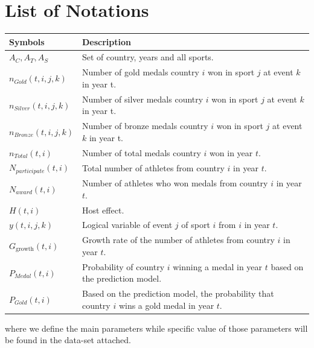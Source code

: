 \documentclass{mcmthesis}
\begin{document}
\section{List of Notations}
\begin{center}
\begin{tabular}{ll}
	\toprule
	{\bf Symbols} & {\bf Description}  \\
	\midrule 
	$A_{C},A_{T},A_{S}$ & Set of country, years and all sports.\\
	$n_{Gold}(t,i,j,k)$ & Number of gold medals country $i$ won in sport $j$ at event $k$ in year t. \\
	$n_{Silver}(t,i,j,k)$ & Number of silver medals country $i$ won in sport $j$ at event $k$ in year t. \\
	$n_{Bronze}(t,i,j,k)$ & Number of bronze medals country $i$ won in sport $j$ at event $k$ in year t. \\
	$n_{Total}(t,i)$ & Number of total medals country $i$ won in year $t$. \\
	$N_{participate}(t,i)$ & Total number of athletes from country $i$ in year $t$. \\
	$N_{award}(t,i)$ & Number of athletes who won medals from country $i$ in year $t$. \\
	$H(t,i)$ & Host effect. \\
	$y(t,i,j,k)$ &  Logical variable of event $j$ of sport $i$ from $i$ in year $t$. \\
	$G_{\text{growth}}(t,i)$ & Growth rate of the number of athletes from country $i$ in year $t$.\\
	$P_{Medal}(t,i)$ & Probability of country $i$ winning a medal in year $t$ based on the prediction model.\\
	$P_{Gold}(t,i)$ & Based on the prediction model, the probability that country $i$ wins a gold medal in year $t$.\\
	\bottomrule
\end{tabular}
\end{center}

\noindent where we define the main parameters while specific value of those 
parameters will be found in the data-set attached.











\end{document}
